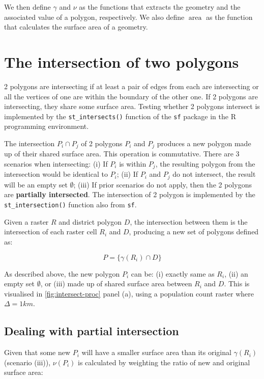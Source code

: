\documentclass{article}
\begin{document}
We then define $\gamma$ and $\nu$ as the functions that extracts the geometry and the associated value of a polygon, respectively. We also define $\operatorname{area}$ as the function that calculates the surface area of a geometry.

\section{The intersection of two polygons}

2 polygons are intersecting if at least a pair of edges from each are intersecting or all the vertices of one are within the boundary of the other one. If 2 polygons are intersecting, they share some surface area. Testing whether 2 polygons intersect is implemented by the \verb|st_intersects()| function of the \verb|sf| package in the R programming environment. 

The intersection $P_i \cap P_j$ of 2 polygons $P_i$ and $P_j$ produces a new polygon made up of their shared surface area. This operation is commutative. There are 3 scenarios when intersecting: (i) If $P_i$ is within $P_j$, the resulting polygon from the intersection would be identical to $P_i$; (ii) If $P_i$ and $P_j$ do not intersect, the result will be an empty set $\emptyset$; (iii) If prior scenarios do not apply, then the 2 polygons are \textbf{partially intersected}. The intersection of 2 polygon is implemented by the \verb|st_intersection()| function also from \verb|sf|. 

Given a raster $R$ and district polygon $D$, the intersection between them is the intersection of each raster cell $R_i$ and $D$, producing a new set of polygons defined as:

\begin{equation*}
    P = \{ \gamma(R_i) \cap D \}
\end{equation*}

As described above, the new polygon $P_i$ can be: (i) exactly same as $R_i$, (ii) an empty set $\emptyset$, or (iii) made up of shared surface area between $R_i$ and $D$. This is visualised in \autoref{fig:intersect-proc} panel (a), using a population count raster where $\Delta = 1\si{km}$.

\subsection{Dealing with partial intersection}
Given that some new $P_i$ will have a smaller surface area than its original $\gamma(R_i)$ (scenario (iii)), $\nu(P_i)$ is calculated by weighting the ratio of new and original surface area:
\end{document}
